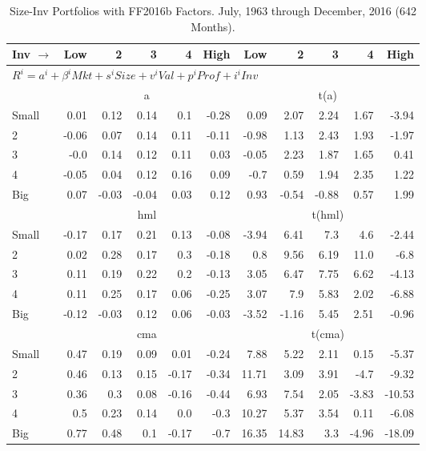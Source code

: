 
\begin{table}[!ht]
\centering
\caption{Size-Inv Portfolios with FF2016b Factors. \footnotesize{July, 1963 through December, 2016 (642 Months).}}
\begin{tabular}{lrrrrrrrrrr}
  \toprule
  Inv $\rightarrow$ & Low & 2 & 3 & 4 & High & Low & 2 & 3 & 4 & High \\ 
  \toprule
  \multicolumn{9}{l}{$R^i=a^i+\beta^iMkt+s^iSize+v^iVal+p^iProf+i^iInv$} \\

      & \multicolumn{5}{c}{a} & \multicolumn{5}{c}{t(a)} \\
    \cmidrule(r){2-6} \cmidrule(r){7-11}
      Small  & 0.01  & 0.12  & 0.14  & 0.1  & -0.28   & 0.09  & 2.07  & 2.24  & 1.67  & -3.94  \\
          2  & -0.06  & 0.07  & 0.14  & 0.11  & -0.11   & -0.98  & 1.13  & 2.43  & 1.93  & -1.97  \\
          3  & -0.0  & 0.14  & 0.12  & 0.11  & 0.03   & -0.05  & 2.23  & 1.87  & 1.65  & 0.41  \\
          4  & -0.05  & 0.04  & 0.12  & 0.16  & 0.09   & -0.7  & 0.59  & 1.94  & 2.35  & 1.22  \\
      Big    & 0.07  & -0.03  & -0.04  & 0.03  & 0.12   & 0.93  & -0.54  & -0.88  & 0.57  & 1.99  \\

      & \multicolumn{5}{c}{hml} & \multicolumn{5}{c}{t(hml)} \\
    \cmidrule(r){2-6} \cmidrule(r){7-11}
      Small  & -0.17  & 0.17  & 0.21  & 0.13  & -0.08   & -3.94  & 6.41  & 7.3  & 4.6  & -2.44  \\
          2  & 0.02  & 0.28  & 0.17  & 0.3  & -0.18   & 0.8  & 9.56  & 6.19  & 11.0  & -6.8  \\
          3  & 0.11  & 0.19  & 0.22  & 0.2  & -0.13   & 3.05  & 6.47  & 7.75  & 6.62  & -4.13  \\
          4  & 0.11  & 0.25  & 0.17  & 0.06  & -0.25   & 3.07  & 7.9  & 5.83  & 2.02  & -6.88  \\
      Big    & -0.12  & -0.03  & 0.12  & 0.06  & -0.03   & -3.52  & -1.16  & 5.45  & 2.51  & -0.96  \\

      & \multicolumn{5}{c}{cma} & \multicolumn{5}{c}{t(cma)} \\
    \cmidrule(r){2-6} \cmidrule(r){7-11}
      Small  & 0.47  & 0.19  & 0.09  & 0.01  & -0.24   & 7.88  & 5.22  & 2.11  & 0.15  & -5.37  \\
          2  & 0.46  & 0.13  & 0.15  & -0.17  & -0.34   & 11.71  & 3.09  & 3.91  & -4.7  & -9.32  \\
          3  & 0.36  & 0.3  & 0.08  & -0.16  & -0.44   & 6.93  & 7.54  & 2.05  & -3.83  & -10.53  \\
          4  & 0.5  & 0.23  & 0.14  & 0.0  & -0.3   & 10.27  & 5.37  & 3.54  & 0.11  & -6.08  \\
      Big    & 0.77  & 0.48  & 0.1  & -0.17  & -0.7   & 16.35  & 14.83  & 3.3  & -4.96  & -18.09  \\

  

  \bottomrule
\end{tabular}
\label{tbl:25_Size_Inv_FF2016b}
\end{table}